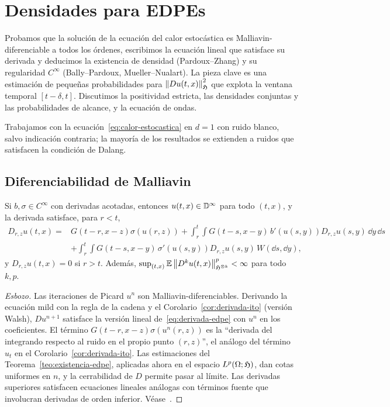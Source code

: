 \chapter{Densidades para EDPEs}\label{cap:densidades-edpe}

\begin{panorama}
Probamos que la solución de la ecuación del calor estocástica es Malliavin-diferenciable a
todos los órdenes, escribimos la ecuación lineal que satisface su derivada y deducimos la
existencia de densidad (Pardoux--Zhang) y su regularidad $C^\infty$ (Bally--Pardoux, Mueller--Nualart).
La pieza clave es una estimación de pequeñas probabilidades para $\left\lVert Du(t,x)\right\rVert^2_{\mathfrak{H}}$
que explota la ventana temporal $[t-\delta,t]$. Discutimos la positividad estricta, las densidades
conjuntas y las probabilidades de alcance, y la ecuación de ondas.
\end{panorama}

Trabajamos con la ecuación~\eqref{eq:calor-estocastica} en $d=1$ con ruido blanco, salvo indicación contraria; la
mayoría de los resultados se extienden a ruidos que satisfacen la condición de Dalang.

\section{Diferenciabilidad de Malliavin}

\begin{teorema}\label{teo:derivada-edpe}
Si $b,\sigma\in C^\infty$ con derivadas acotadas, entonces $u(t,x)\in\mathbb{D}^\infty$ para todo $(t,x)$,
y la derivada satisface, para $r<t$,
\begin{equation}\label{eq:derivada-edpe}
\begin{aligned}
  D_{r,z}u(t,x)={}&G(t-r,x-z)\sigma(u(r,z))+\int_r^t\!\!\int G(t-s,x-y)\,b'(u(s,y))D_{r,z}u(s,y)\,\dd y\,\dd s\\
  &+\int_r^t\!\!\int G(t-s,x-y)\,\sigma'(u(s,y))D_{r,z}u(s,y)\,W(\dd s,\dd y),
\end{aligned}
\end{equation}
y $D_{r,z}u(t,x)=0$ si $r>t$. Además, $\sup_{(t,x)}\mathbb{E}\left\lVert D^ku(t,x)\right\rVert^p_{\mathfrak{H}^{\otimes k}}<\infty$ para todo $k,p$.
\end{teorema}

\begin{proof}[Esbozo]
Las iteraciones de Picard $u^n$ son Malliavin-diferenciables. Derivando la ecuación mild
con la regla de la cadena y el Corolario~\ref{cor:derivada-ito} (versión Walsh), $Du^{n+1}$ satisface la versión lineal
de~\eqref{eq:derivada-edpe} con $u^n$ en los coeficientes. El término $G(t-r,x-z)\sigma(u^n(r,z))$ es la ``derivada
del integrando respecto al ruido en el propio punto $(r,z)$'', el análogo del término $u_t$ en el
Corolario~\ref{cor:derivada-ito}. Las estimaciones del Teorema~\ref{teo:existencia-edpe}, aplicadas ahora en el espacio $L^p(\Omega;\mathfrak{H})$, dan
cotas uniformes en $n$, y la cerrabilidad de $D$ permite pasar al límite. Las derivadas superiores
satisfacen ecuaciones lineales análogas con términos fuente que involucran derivadas de orden
inferior. Véase~\cite{BallyPardoux98,Nualart06,SanzSole05}.
\end{proof}

